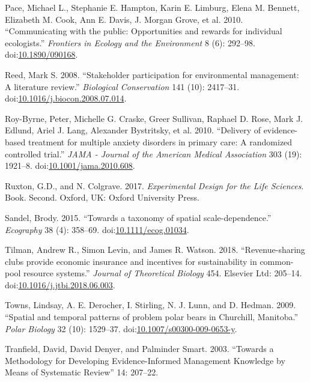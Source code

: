 \documentclass[fleqn,10pt]{wlpeerj} %
\begin{document}
\hypertarget{ref-Pace2010}{}
Pace, Michael L., Stephanie E. Hampton, Karin E. Limburg, Elena M.
Bennett, Elizabeth M. Cook, Ann E. Davis, J. Morgan Grove, et al. 2010.
``Communicating with the public: Opportunities and rewards for
individual ecologists.'' \emph{Frontiers in Ecology and the Environment}
8 (6): 292--98.
doi:\href{https://doi.org/10.1890/090168}{10.1890/090168}.

\hypertarget{ref-Reed2008}{}
Reed, Mark S. 2008. ``Stakeholder participation for environmental
management: A literature review.'' \emph{Biological Conservation} 141
(10): 2417--31.
doi:\href{https://doi.org/10.1016/j.biocon.2008.07.014}{10.1016/j.biocon.2008.07.014}.

\hypertarget{ref-Roy-Byrne2010}{}
Roy-Byrne, Peter, Michelle G. Craske, Greer Sullivan, Raphael D. Rose,
Mark J. Edlund, Ariel J. Lang, Alexander Bystritsky, et al. 2010.
``Delivery of evidence-based treatment for multiple anxiety disorders in
primary care: A randomized controlled trial.'' \emph{JAMA - Journal of
the American Medical Association} 303 (19): 1921--8.
doi:\href{https://doi.org/10.1001/jama.2010.608}{10.1001/jama.2010.608}.

\hypertarget{ref-Ruxton2017}{}
Ruxton, G.D., and N. Colgrave. 2017. \emph{Experimental Design for the
Life Sciences}. Book. Second. Oxford, UK: Oxford University Press.

\hypertarget{ref-Sandel2015}{}
Sandel, Brody. 2015. ``Towards a taxonomy of spatial scale-dependence.''
\emph{Ecography} 38 (4): 358--69.
doi:\href{https://doi.org/10.1111/ecog.01034}{10.1111/ecog.01034}.

\hypertarget{ref-Tilman2018}{}
Tilman, Andrew R., Simon Levin, and James R. Watson. 2018.
``Revenue-sharing clubs provide economic insurance and incentives for
sustainability in common-pool resource systems.'' \emph{Journal of
Theoretical Biology} 454. Elsevier Ltd: 205--14.
doi:\href{https://doi.org/10.1016/j.jtbi.2018.06.003}{10.1016/j.jtbi.2018.06.003}.

\hypertarget{ref-Towns2009}{}
Towns, Lindsay, A. E. Derocher, I. Stirling, N. J. Lunn, and D. Hedman.
2009. ``Spatial and temporal patterns of problem polar bears in
Churchill, Manitoba.'' \emph{Polar Biology} 32 (10): 1529--37.
doi:\href{https://doi.org/10.1007/s00300-009-0653-y}{10.1007/s00300-009-0653-y}.

\hypertarget{ref-Tranfield2003}{}
Tranfield, David, David Denyer, and Palminder Smart. 2003. ``Towards a
Methodology for Developing Evidence-Informed Management Knowledge by
Means of Systematic Review'' 14: 207--22.
\end{document}
